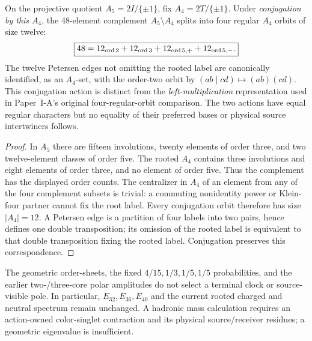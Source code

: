 \documentclass[12pt,a4paper]{article}
\begin{document}
\begin{proposition}
\label{p6:prop:v321-petersen-order-sheets}
On the projective quotient $A_5=2I/\{\pm1\}$, fix
$A_4=2T/\{\pm1\}$. Under \emph{conjugation by this $A_4$}, the
48-element complement $A_5\setminus A_4$ splits into four regular
$A_4$ orbits of size twelve:
\[
 \boxed{48=12_{\rm ord\,2}+12_{\rm ord\,3}
       +12_{\rm ord\,5,+}+12_{\rm ord\,5,-}.}
\]
The twelve Petersen edges not omitting the rooted label are canonically
identified, as an $A_4$-set, with the order-two orbit by
$(ab\mid cd)\mapsto(ab)(cd)$. This conjugation action is distinct from
the \emph{left-multiplication} representation used in Paper~I-A's original
four-regular-orbit comparison. The two actions have equal regular
characters but no equality of their preferred bases or physical source
intertwiners follows.
\end{proposition}
\begin{proof}
In $A_5$ there are fifteen involutions, twenty elements of order three,
and two twelve-element classes of order five. The rooted $A_4$ contains
three involutions and eight elements of order three, and no element of
order five. Thus the complement has the displayed order counts. The
centralizer in $A_4$ of an element from any of the four complement subsets
is trivial: a commuting nonidentity power or Klein-four partner cannot
fix the root label. Every conjugation orbit therefore has size $|A_4|=12$.
A Petersen edge is a partition of four labels into two pairs, hence defines
one double transposition; its omission of the rooted label is equivalent
to that double transposition fixing the rooted label. Conjugation preserves
this correspondence.
\end{proof}

\begin{remark}
The geometric order-sheets, the fixed $4/15,1/3,1/5,1/5$ probabilities,
and the earlier two-/three-core polar amplitudes do not select a terminal
clock or source-visible pole. In particular, $E_{32},E_{36},E_{40}$ and the
current rooted charged and neutral spectrum remain unchanged. A hadronic
mass calculation requires an action-owned color-singlet contraction and its
physical source/receiver residues; a geometric eigenvalue is insufficient.
\end{remark}




\end{document}
